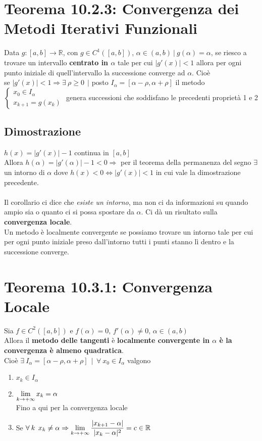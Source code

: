 \documentclass[10pt]{book}
\begin{document}
\section{Teorema 10.2.3: Convergenza dei Metodi Iterativi Funzionali} Data $g : [a, b] \rightarrow\mathbb{R}$, con $g \in C^1([a, b])$, $\alpha \in (a, b)\:|\:g(\alpha) = \alpha$, se riesco a trovare un intervallo \textbf{centrato in $\alpha$} tale per cui $|g'(x)| < 1$ allora per ogni punto iniziale di quell'intervallo la successione converge ad $\alpha$. Cioè\\
se $|g'(x)| < 1 \Rightarrow \exists\:\rho\geq 0\:\:|$ posto $I_\alpha = [\alpha - \rho, \alpha + \rho]$ il metodo $\left\{\begin{array}{l}
x_0 \in I_\alpha\\
x_{k+1} = g(x_k)
\end{array}\right.$ genera successioni che soddisfano le precedenti proprietà 1 e 2
\subsection{Dimostrazione} $h(x) = |g'(x)| - 1$ continua in $[a, b]$\\
Allora $h(\alpha) = |g'(\alpha)| - 1 < 0 \Rightarrow$ per il teorema della permanenza del segno $\exists$ un intorno di $\alpha$ dove $h(x) < 0 \Leftrightarrow |g'(x)| < 1$ in cui vale la dimostrazione precedente.\\\\
Il corollario ci dice che \textit{esiste un intorno}, ma non ci da informazioni su quando ampio sia o quanto ci si possa spostare da $\alpha$. Ci dà un risultato sulla \textbf{convergenza locale}.\\
Un metodo è localmente convergente se possiamo trovare un intorno tale per cui per ogni punto iniziale preso dall'intorno tutti i punti stanno lì dentro e la successione converge.
\section{Teorema 10.3.1: Convergenza Locale} Sia $f\in C^2([a, b])$ e $f(\alpha) = 0$, $f'(\alpha) \neq 0$, $\alpha \in (a, b)$\\
Allora il \textbf{metodo delle tangenti} è \textbf{localmente convergente in $\alpha$ è la convergenza è almeno quadratica}.\\Cioè $\exists\:I_\alpha = [\alpha - \rho, \alpha + \rho]\:\:|\:\:\forall\:x_0\in I_\alpha$ valgono
\begin{enumerate}
	\item $x_k \in I_\alpha$
	\item $\mathlarger{\lim_{k\to+\infty} x_k = \alpha}$\\
	Fino a qui per la convergenza locale
	\item Se $\forall\:k\:\:x_k\neq\alpha \Rightarrow \mathlarger{\lim_{k\to+\infty} \frac{|x_{k+1} - \alpha|}{|x_k - \alpha|^2}} = c \in \mathbb{R}$
\end{enumerate}
\end{document}

